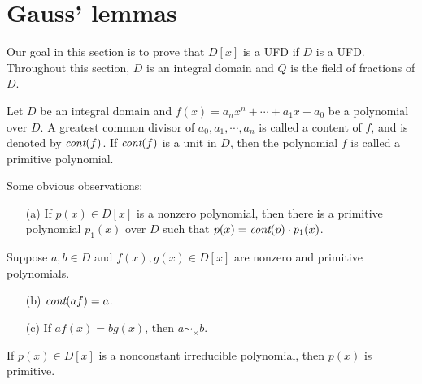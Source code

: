 \section{Gauss' lemmas}

Our goal in this section is to prove that $D[x]$ is a UFD if $D$ is a UFD.
Throughout this section, $D$ is an integral domain and $Q$ is the field of fractions of $D$.

\begin{defi}
    Let $D$ be an integral domain and $f(x)=a_nx^n+\cdots+a_1x+a_0$ be a polynomial over $D$.
    A greatest common divisor of $a_0, a_1, \cdots, a_n$ is called a content of $f$, and is denoted by $\textit{cont}(f)$.
    If $\textit{cont}(f)$ is a unit in $D$, then the polynomial $f$ is called a primitive polynomial.
\end{defi}

Some obvious observations:
\begin{obs}
    \begin{enumerate}
        \item[(a)]
        {
            If $p(x)\in D[x]$ is a nonzero polynomial, then there is a primitive polynomial $p_1(x)$ over $D$ such that $p(x)=\textit{cont}(p)\cdot p_1(x)$.
        }
    \end{enumerate}
    Suppose $a, b\in D$ and $f(x), g(x)\in D[x]$ are nonzero and primitive polynomials.
        \begin{enumerate}
        \item[(b)]
        {
            $\textit{cont}(af)=a$.
        }
        \item[(c)]
        {
            If $af(x)=bg(x)$, then $a\sim_\times b$.
        }
    \end{enumerate}
\end{obs}
\begin{exmp}
    If $p(x)\in D[x]$ is a nonconstant irreducible polynomial, then $p(x)$ is primitive.
\end{exmp}

